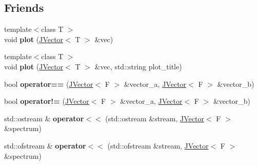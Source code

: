 \subsection*{Friends}
\begin{DoxyCompactItemize}
\item 
{\footnotesize template$<$class T $>$ }\\void {\bfseries plot} (\hyperlink{classjaspl_1_1_j_vector}{J\+Vector}$<$ T $>$ \&vec)\hypertarget{classjaspl_1_1_j_vector_a6dc51c5dfdd4aacdf08ebad6d0d2afae}{}\label{classjaspl_1_1_j_vector_a6dc51c5dfdd4aacdf08ebad6d0d2afae}

\item 
{\footnotesize template$<$class T $>$ }\\void {\bfseries plot} (\hyperlink{classjaspl_1_1_j_vector}{J\+Vector}$<$ T $>$ \&vec, std\+::string plot\+\_\+title)\hypertarget{classjaspl_1_1_j_vector_a61b154a38160f96e7326fa73252f59ff}{}\label{classjaspl_1_1_j_vector_a61b154a38160f96e7326fa73252f59ff}

\item 
bool {\bfseries operator==} (\hyperlink{classjaspl_1_1_j_vector}{J\+Vector}$<$ F $>$ \&vector\+\_\+a, \hyperlink{classjaspl_1_1_j_vector}{J\+Vector}$<$ F $>$ \&vector\+\_\+b)\hypertarget{classjaspl_1_1_j_vector_a81fad03b34e80d689ede7e6d7178ed56}{}\label{classjaspl_1_1_j_vector_a81fad03b34e80d689ede7e6d7178ed56}

\item 
bool {\bfseries operator!=} (\hyperlink{classjaspl_1_1_j_vector}{J\+Vector}$<$ F $>$ \&vector\+\_\+a, \hyperlink{classjaspl_1_1_j_vector}{J\+Vector}$<$ F $>$ \&vector\+\_\+b)\hypertarget{classjaspl_1_1_j_vector_ad9f0b4638213ca7ffad3c23031a58c35}{}\label{classjaspl_1_1_j_vector_ad9f0b4638213ca7ffad3c23031a58c35}

\item 
std\+::ostream \& {\bfseries operator$<$$<$} (std\+::ostream \&stream, \hyperlink{classjaspl_1_1_j_vector}{J\+Vector}$<$ F $>$ \&spectrum)\hypertarget{classjaspl_1_1_j_vector_a5bb4330c3ad441ee4a22dd90c019f20d}{}\label{classjaspl_1_1_j_vector_a5bb4330c3ad441ee4a22dd90c019f20d}

\item 
std\+::ofstream \& {\bfseries operator$<$$<$} (std\+::ofstream \&stream, \hyperlink{classjaspl_1_1_j_vector}{J\+Vector}$<$ F $>$ \&spectrum)\hypertarget{classjaspl_1_1_j_vector_aa520fbd88b8c88fc26f1d352ac911f37}{}\label{classjaspl_1_1_j_vector_aa520fbd88b8c88fc26f1d352ac911f37}


\end{DoxyCompactItemize}
